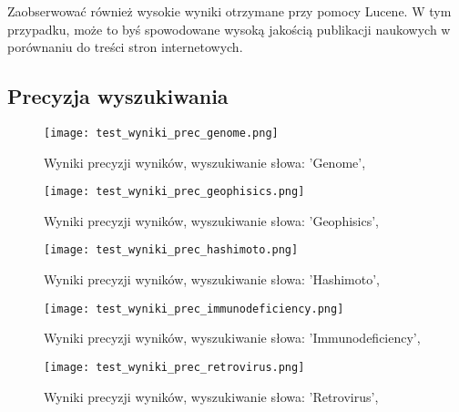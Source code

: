 Zaobserwować również wysokie wyniki otrzymane przy pomocy Lucene. W tym przypadku, może to byś spowodowane wysoką jakością publikacji naukowych w porównaniu do treści stron internetowych.





\subsection{Precyzja wyszukiwania}



\begin{figure}[tb]
    \centering
    \texttt{[image: test\_wyniki\_prec\_genome.png]}
    \caption{Wyniki precyzji wyników, wyszukiwanie słowa: 'Genome', }
    \label{fig:prec-genome}

\end{figure}



\begin{figure}[tb]
    \centering
    \texttt{[image: test\_wyniki\_prec\_geophisics.png]}
    \caption{Wyniki precyzji wyników, wyszukiwanie słowa: 'Geophisics', }
    \label{fig:prec-geophisics}

\end{figure}

\begin{figure}[tb]
    \centering
    \texttt{[image: test\_wyniki\_prec\_hashimoto.png]}
    \caption{Wyniki precyzji wyników, wyszukiwanie słowa: 'Hashimoto', }
    \label{fig:prec-hashimoto}

\end{figure}


\begin{figure}[tb]
    \centering
    \texttt{[image: test\_wyniki\_prec\_immunodeficiency.png]}
    \caption{Wyniki precyzji wyników, wyszukiwanie słowa: 'Immunodeficiency', }
    \label{fig:prec-immunodeficiency}

\end{figure}


\begin{figure}[tb]
    \centering
    \texttt{[image: test\_wyniki\_prec\_retrovirus.png]}
    \caption{Wyniki precyzji wyników, wyszukiwanie słowa: 'Retrovirus', }
    \label{fig:prec-retrovirus}

\end{figure}



